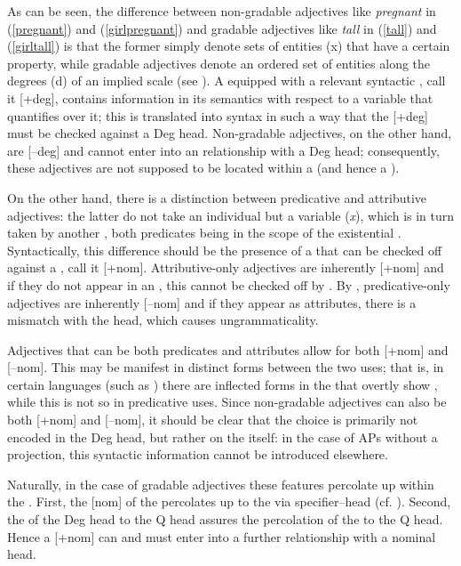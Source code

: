 As can be seen, the difference between non-gradable adjectives like \textit{pregnant} in (\ref{pregnant}) and (\ref{girlpregnant}) and gradable adjectives like \textit{tall} in (\ref{tall}) and (\ref{girltall}) is that the former simply denote sets of entities (x) that have a certain property, while gradable adjectives denote an ordered set of entities along the degrees (d) of an implied scale (see \citealt{kennedymcnally2005, cresswell1976, heim2000, kennedy1999}). A  equipped with a relevant syntactic , call it [+deg], contains information in its semantics with respect to a  variable that quantifies over it; this is translated into syntax in such a way that the [+deg]  must be checked against a Deg head. Non-gradable adjectives, on the other hand, are [--deg] and cannot enter into an  relationship with a Deg head; consequently, these adjectives are not supposed to be located within a  (and hence a ).

On the other hand, there is a distinction between predicative and attributive adjectives: the latter do not take an individual but a variable (\textit{x}), which is in turn taken by another , both predicates being in the scope of the existential . Syntactically, this difference should be the presence of a  that can be checked off against a , call it [+nom]. Attributive-only adjectives are inherently [+nom] and if they do not appear in an , this  cannot be checked off by . By , predicative-only adjectives are inherently [--nom] and if they appear as attributes, there is a  mismatch with the  head, which causes ungrammaticality.

Adjectives that can be both predicates and attributes allow for both [+nom] and [--nom]. This may be manifest in distinct forms between the two uses; that is, in certain languages (such as ) there are inflected forms in the  that overtly show , while this is not so in predicative uses. Since non-gradable adjectives can also be both [+nom] and [--nom], it should be clear that the choice is primarily not encoded in the Deg head, but rather on the  itself: in the case of APs without a  projection, this syntactic information cannot be introduced elsewhere.

Naturally, in the case of gradable adjectives these features percolate up within the . First, the [\textpm nom]  of the  percolates up to the  via specifier--head  (cf. \citealt{yoon2001, ortizdeurbina1993, horvath1997}). Second, the  of the Deg head to the Q head assures the percolation of the  to the Q head. Hence a [+nom]  can and must enter into a further  relationship with a nominal head.

